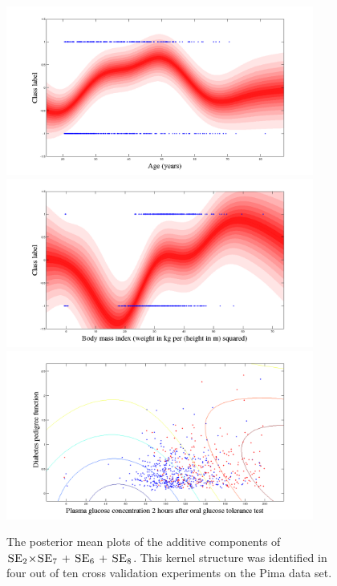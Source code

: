 \documentclass[a4paper,12pt ]{report}
\newcommand{\kerntimes}{ \! \times \!}
\newcommand{\kernplus}{ \, + \,}
\begin{document}
\begin{figure}

\caption{The posterior mean plots of the additive components of $\SE_2\kerntimes\SE_7 \kernplus \SE_6 \kernplus \SE_8$. This kernel structure was identified in four out of ten cross validation experiments on the Pima data set. }

\begin{center}

\includegraphics[trim=0cm 0cm 0cm 0cm, width=0.9\textwidth]{figures/pima/age.png} %
\includegraphics[trim=0cm 0cm 0cm 0cm, width=0.9\textwidth]{figures/pima/bmi.png} %
\includegraphics[trim=0cm 0cm 0cm 0cm, width=0.9\textwidth]{figures/pima/pedigreeglucose.png}  %

\end{center}

\end{figure}
\end{document}
